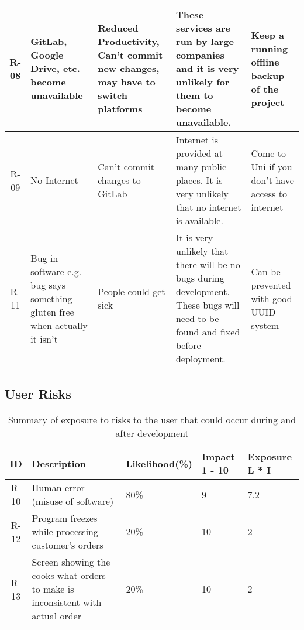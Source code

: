 \begin{table}[H]
\begin{tabularx}{\linewidth}{|c|X|X|X|X|}
    \hline
    R-08 & GitLab, Google Drive, etc. become unavailable & Reduced Productivity, Can’t commit new changes, may have to switch platforms & These services are run by large companies and it is very unlikely for them to become unavailable. & Keep a running offline backup of the project \\
    \hline
    R-09 & No Internet & Can’t commit changes to GitLab & Internet is provided at many public places. It is very unlikely that no internet is available. & Come to Uni if you don’t have access to internet \\
    \hline
    R-11 & Bug in software e.g. bug says something gluten free when actually it isn’t & People could get sick & It is very unlikely that there will be no bugs during development. These bugs will need to be found and fixed before deployment. & Can be prevented with good UUID system \\
    \hline
\end{tabularx}
\end{table}


\subsection{User Risks}

\begin{table}[!ht]
\centering
\caption{Summary of exposure to risks to the user that could occur during and after development}
\begin{tabularx}{\linewidth}{|c|X|X|X|X|}
	\hline
    ID & Description & Likelihood(\%) & Impact
    1 - 10 & Exposure
    L * I \\
    \hline
    R-10 & Human error (misuse of software) & 80\% & 9 & 7.2 \\
    \hline
    R-12 & Program freezes while processing customer’s orders & 20\% & 10 & 2 \\
    \hline
    R-13 & Screen showing the cooks what orders to make is inconsistent with actual order & 20\% & 10 & 2 \\
    \hline
\end{tabularx}
\end{table}


